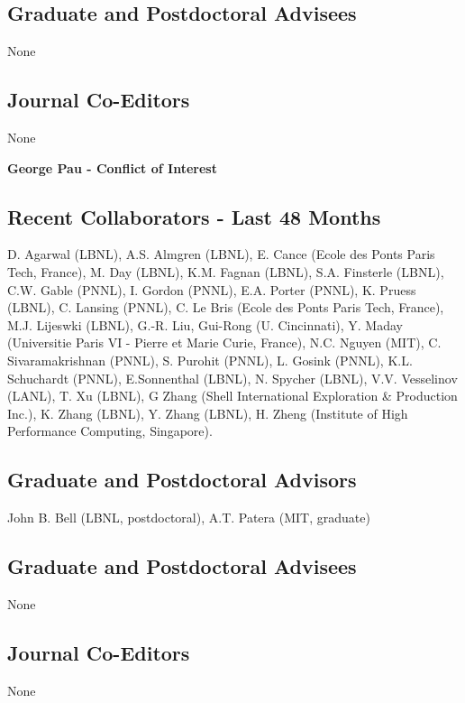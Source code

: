 \documentclass[11pt]{article}
\begin{document}
\subsection*{Graduate and Postdoctoral Advisees} 
None

\subsection*{Journal Co-Editors} None



\newpage
\begin{center}
{\Large{\textbf{George Pau - Conflict of Interest}}}
\end{center}

\subsection*{Recent Collaborators - Last 48 Months}
D. Agarwal (LBNL), A.S. Almgren (LBNL), E. Cance (Ecole des Ponts Paris Tech, France), M. Day (LBNL), K.M. Fagnan (LBNL), S.A. Finsterle (LBNL), C.W. Gable (PNNL), I. Gordon (PNNL), E.A. Porter (PNNL), K. Pruess (LBNL), C. Lansing (PNNL), C. Le Bris (Ecole des Ponts Paris Tech, France), M.J. Lijeswki (LBNL), G.-R. Liu, Gui-Rong (U. Cincinnati), Y. Maday (Universitie Paris VI - Pierre et Marie Curie, France),  N.C. Nguyen (MIT), C. Sivaramakrishnan (PNNL), S. Purohit (PNNL), L. Gosink (PNNL), K.L. Schuchardt (PNNL), E.Sonnenthal (LBNL), N. Spycher (LBNL), V.V. Vesselinov (LANL), T. Xu (LBNL), G Zhang (Shell International Exploration \& Production Inc.), K. Zhang (LBNL), Y. Zhang (LBNL), H. Zheng (Institute of High Performance Computing, Singapore).

\subsection*{Graduate and Postdoctoral Advisors}
John B. Bell (LBNL, postdoctoral), A.T. Patera (MIT, graduate)

\subsection*{Graduate and Postdoctoral Advisees} 
None

\subsection*{Journal Co-Editors} None
\end{document}
